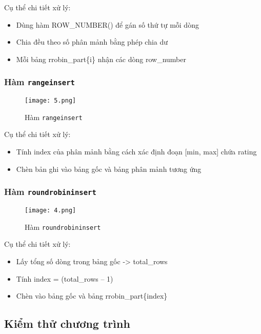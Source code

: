 \documentclass[14pt]{extarticle}
\begin{document}
Cụ thể chi tiết xử lý:
\begin{itemize}
    \item Dùng hàm ROW\_NUMBER() để gán số thứ tự mỗi dòng
    \item Chia đều theo số phân mảnh bằng phép chia dư %
    \item Mỗi bảng rrobin\_part\{i\} nhận các dòng row\_number %
\end{itemize}

\subsubsection{Hàm \texttt{rangeinsert}}
\begin{figure}[H]
    \centering
    \texttt{[image: 5.png]}
    \caption{Hàm \texttt{rangeinsert}}

\end{figure}

Cụ thể chi tiết xử lý:
\begin{itemize}
    \item Tính index của phân mảnh bằng cách xác định đoạn [min, max] chứa rating
    \item Chèn bản ghi vào bảng gốc và bảng phân mảnh tương ứng
\end{itemize}

\subsubsection{Hàm \texttt{roundrobininsert}}

\begin{figure}[H]
    \centering
    \texttt{[image: 4.png]}
    \caption{Hàm \texttt{roundrobininsert}}

\end{figure}

Cụ thể chi tiết xử lý:
\begin{itemize}
    \item Lấy tổng số dòng trong bảng gốc -> total\_rows
    \item Tính index = (total\_rows – 1) %
    \item Chèn vào bảng gốc và bảng rrobin\_part\{index\}
\end{itemize}

\subsection{Kiểm thử chương trình}
\end{document}
